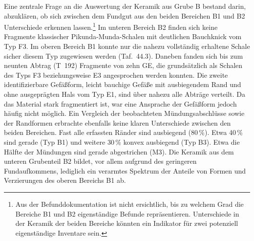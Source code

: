 Eine zentrale Frage an die Auswertung der Keramik aus Grube B bestand darin, abzuklären, ob sich zwischen dem Fundgut aus den beiden Bereichen B1 und B2 Unterschiede erkennen lassen.\footnote{Aus der Befunddokumentation ist nicht ersichtlich, bis zu welchem Grad die Bereiche B1 und B2 eigenständige Befunde repräsentieren. Unterschiede in der Keramik der beiden Bereiche könnten ein Indikator für zwei potenziell eigenständige Inventare sein.} Im unteren Bereich B2 finden sich keine Fragmente klassischer Pikunda-Munda-Schalen mit deutlichen Bauchknick vom Typ F3. Im oberen Bereich B1 konnte nur die nahezu vollständig erhaltene Schale sicher diesem Typ zugewiesen werden (Taf.~44.3). Daneben fanden sich bis zum neunten Abtrag (T~192) Fragmente von zehn GE, die grundsätzlich als Schalen des Typs F3 beziehungsweise E3 angesprochen werden konnten. Die zweite identifizierbare Gefäßform, leicht bauchige Gefäße mit ausbiegendem Rand und ohne ausgeprägten Hals vom Typ E1, sind über nahezu alle Abträge verteilt. Da das Material stark fragmentiert ist, war eine Ansprache der Gefäßform jedoch häufig nicht möglich. Ein Vergleich der beobachteten Mündungsabschlüsse sowie der Randformen erbrachte ebenfalls keine klaren Unterschiede zwischen den beiden Bereichen. Fast alle erfassten Ränder sind ausbiegend (80\,\%). Etwa 40\,\% sind gerade (Typ B1) und weitere 30\,\% konvex ausbiegend (Typ B3). Etwa die Hälfte der Mündungen sind gerade abgestrichen (M3). Die Keramik aus dem unteren Grubenteil B2 bildet, vor allem aufgrund des geringeren Fundaufkommens, lediglich ein verarmtes Spektrum der Anteile von Formen und Verzierungen des oberen Bereichs B1 ab.

